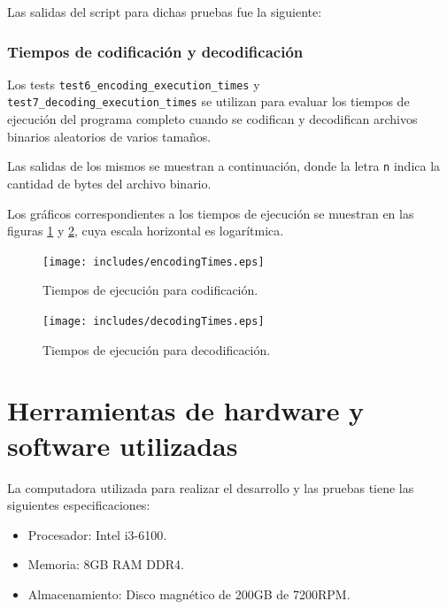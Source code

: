 Las salidas del script para dichas pruebas fue la siguiente:



\subsubsection{Tiempos de codificación y decodificación}

Los tests \texttt{test6\_encoding\_execution\_times} y \texttt{test7\_decoding\_execution\_times} se utilizan para evaluar los tiempos de ejecución del programa completo cuando se codifican y decodifican archivos binarios aleatorios de varios tamaños.

Las salidas de los mismos se muestran a continuación, donde la letra \texttt{n} indica la cantidad de bytes del archivo binario.



Los gráficos correspondientes a los tiempos de ejecución se muestran en las figuras \ref{encodeTime} y \ref{decodeTime}, cuya escala horizontal es logarítmica.

\begin{figure}[h]
	\centering
	\texttt{[image: includes/encodingTimes.eps]}
	\caption{Tiempos de ejecución para codificación.}
	\label{encodeTime}
\end{figure}

\begin{figure}[h]
	\centering
	\texttt{[image: includes/decodingTimes.eps]}
	\caption{Tiempos de ejecución para decodificación.}
	\label{decodeTime}
\end{figure}

\clearpage

\section{Herramientas de hardware y software utilizadas}\label{sec_tools}

La computadora utilizada para realizar el desarrollo y las pruebas tiene las siguientes especificaciones:
\begin{itemize}
	\item Procesador: Intel i3-6100.
	\item Memoria: 8GB RAM DDR4.
	\item Almacenamiento: Disco magnético de 200GB de 7200RPM.
\end{itemize}

